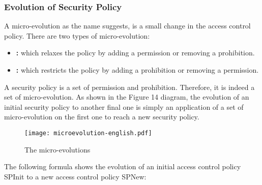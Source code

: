 \documentclass{acm_proc_article-sp}
\begin{document}
\subsubsection{Evolution of Security Policy}
A micro-evolution as the name suggests, is a small change in the access control policy. There are two types of micro-evolution:
\begin{itemize}
 \item \textbf{:} which relaxes the policy by adding a permission or removing a prohibition.
 \item \textbf{:} which restricts the policy by adding a prohibition or removing a permission.
\end{itemize}
A security policy is a set of permission and prohibition. Therefore, it is indeed a set of micro-evolution. As shown in the Figure 14 diagram, the evolution of an initial security policy to another final one is simply an application of a set of micro-evolution on the first one to reach a new security policy.
\newpage                                                                   \begin{figure}[h!]                                                          \centering                                                                  \texttt{[image: microevolution-english.pdf]}\caption{The micro-evolutions}                                              \label{The micro-evolutions}                                                \end{figure}                                                                

The following formula shows the evolution of an initial access control policy SPInit to a new access control policy SPNew:\\

\\
\end{document}
